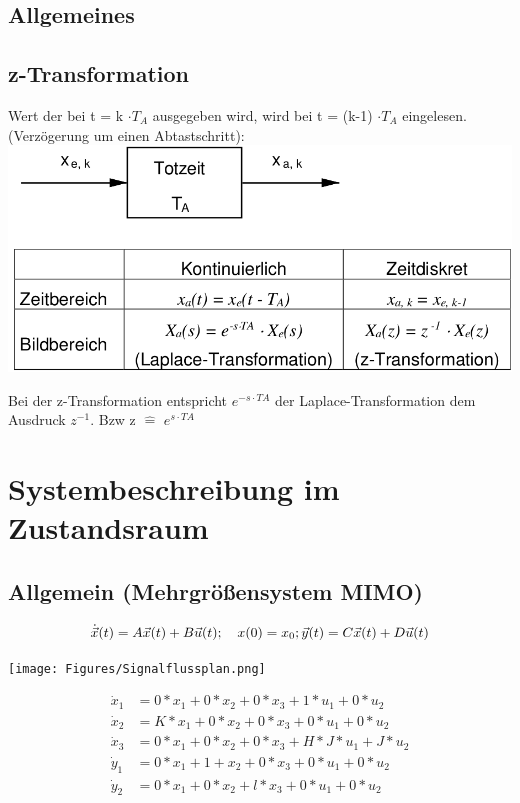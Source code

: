 \documentclass[10pt,a4paper]{article}
\begin{document}
    \subsection{Allgemeines}
    \subsection{z-Transformation}
    Wert der bei t = k $\cdot T_A$ ausgegeben wird, wird bei t = (k-1) $\cdot T_A$ eingelesen.
    (Verzögerung um einen Abtastschritt):\\
    \includegraphics[width=.45\textwidth]{Figures/zTrans.png}

    Bei der z-Transformation entspricht $e^{-s \cdot TA}$ der
    Laplace-Transformation dem Ausdruck
    $z^{-1}$. Bzw z $\hat{=}$ $e^{s \cdot TA}$






  \section{Systembeschreibung im Zustandsraum}
  \subsection{Allgemein (Mehrgrößensystem MIMO) }
  \begin{mdframed}[style=exercise]
    \begin{equation}
      \dot{\Vec{x}}(t) = A\vec{x}(t) + B\vec{u}(t); \quad x(0) = x_{0}; \\*
      \vec{y}(t) = C\vec{x}(t) + D\vec{u}(t)
    \end{equation}
  \end{mdframed}
  \begin{center}
    \texttt{[image: Figures/Signalflussplan.png]}
  \end{center}
  \begin{mdframed}[style=exercise]
    \begin{align*}
      \dot{x}_{1} &= 0*x_{1} +0*x_{2} +0*x_{3} +1*u_{1}+0*u_{2} \\
      \dot{x}_{2} &= K*x_{1} +0*x_{2} +0*x_{3} +0*u_{1}+0*u_{2} \\
      \dot{x}_{3} &= 0*x_{1} +0*x_{2} +0*x_{3} +H*J*u_{1}+J*u_{2} \\
      \dot{y}_{1} &= 0*x_{1} +1+x_{2} +0*x_{3} +0*u_{1}+0*u_{2} \\
      \dot{y}_{2} &= 0*x_{1} +0*x_{2} +l*x_{3} +0*u_{1}+0*u_{2} \\
    \end{align*}
  \end{mdframed}
\end{document}

